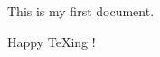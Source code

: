 \documentclass{article}
\begin{document}
This is my first document.

Happy \TeX ing !
\end{document}
